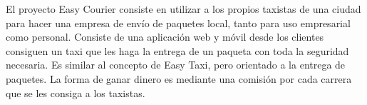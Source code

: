 \begin{resumen}
El proyecto Easy Courier consiste en utilizar a los propios taxistas de una ciudad para hacer una
empresa de envío de paquetes local, tanto para uso empresarial como personal. Consiste de una
aplicación web y móvil desde los clientes consiguen un taxi que les haga la entrega de un paqueta
con toda la seguridad necesaria. Es similar al concepto de Easy Taxi, pero orientado a la entrega de
paquetes. La forma de ganar dinero es mediante una comisión por cada carrera que se les consiga a
los taxistas.
\end{resumen}
